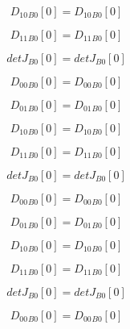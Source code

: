 \documentclass{article}
\begin{document}
\begin{dmath}{D_{10}{_{B0}}}[{0}] = {D_{10}{_{B0}}}[{0}]\end{dmath}

\begin{dmath}{D_{11}{_{B0}}}[{0}] = {D_{11}{_{B0}}}[{0}]\end{dmath}

\begin{dmath}{detJ{_{B0}}}[{0}] = {detJ{_{B0}}}[{0}]\end{dmath}

\begin{dmath}{D_{00}{_{B0}}}[{0}] = {D_{00}{_{B0}}}[{0}]\end{dmath}

\begin{dmath}{D_{01}{_{B0}}}[{0}] = {D_{01}{_{B0}}}[{0}]\end{dmath}

\begin{dmath}{D_{10}{_{B0}}}[{0}] = {D_{10}{_{B0}}}[{0}]\end{dmath}

\begin{dmath}{D_{11}{_{B0}}}[{0}] = {D_{11}{_{B0}}}[{0}]\end{dmath}

\begin{dmath}{detJ{_{B0}}}[{0}] = {detJ{_{B0}}}[{0}]\end{dmath}

\begin{dmath}{D_{00}{_{B0}}}[{0}] = {D_{00}{_{B0}}}[{0}]\end{dmath}

\begin{dmath}{D_{01}{_{B0}}}[{0}] = {D_{01}{_{B0}}}[{0}]\end{dmath}

\begin{dmath}{D_{10}{_{B0}}}[{0}] = {D_{10}{_{B0}}}[{0}]\end{dmath}

\begin{dmath}{D_{11}{_{B0}}}[{0}] = {D_{11}{_{B0}}}[{0}]\end{dmath}

\begin{dmath}{detJ{_{B0}}}[{0}] = {detJ{_{B0}}}[{0}]\end{dmath}

\begin{dmath}{D_{00}{_{B0}}}[{0}] = {D_{00}{_{B0}}}[{0}]\end{dmath}
\end{document}

